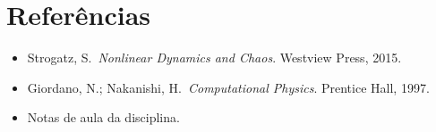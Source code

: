 \documentclass[12pt,a4paper]{article}
\begin{document}
\section*{Refer\^encias}
\begin{itemize}
  \item Strogatz, S.\ \textit{Nonlinear Dynamics and Chaos}. Westview Press, 2015.
  \item Giordano, N.; Nakanishi, H.\ \textit{Computational Physics}. Prentice Hall, 1997.
  \item Notas de aula da disciplina.
\end{itemize}
\end{document}
